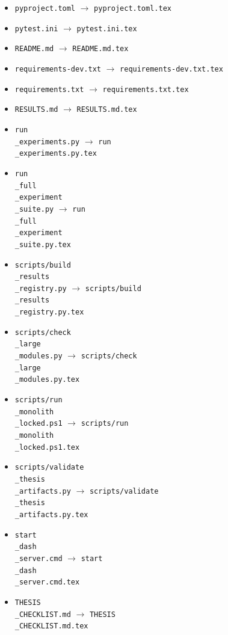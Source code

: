 \documentclass[11pt]{article}
\begin{document}
\begin{itemize}
\item \texttt{pyproject.toml} $\rightarrow$ \texttt{pyproject.toml.tex}
\item \texttt{pytest.ini} $\rightarrow$ \texttt{pytest.ini.tex}
\item \texttt{README.md} $\rightarrow$ \texttt{README.md.tex}
\item \texttt{requirements-dev.txt} $\rightarrow$ \texttt{requirements-dev.txt.tex}
\item \texttt{requirements.txt} $\rightarrow$ \texttt{requirements.txt.tex}
\item \texttt{RESULTS.md} $\rightarrow$ \texttt{RESULTS.md.tex}
\item \texttt{run\\_experiments.py} $\rightarrow$ \texttt{run\\_experiments.py.tex}
\item \texttt{run\\_full\\_experiment\\_suite.py} $\rightarrow$ \texttt{run\\_full\\_experiment\\_suite.py.tex}
\item \texttt{scripts/build\\_results\\_registry.py} $\rightarrow$ \texttt{scripts/build\\_results\\_registry.py.tex}
\item \texttt{scripts/check\\_large\\_modules.py} $\rightarrow$ \texttt{scripts/check\\_large\\_modules.py.tex}
\item \texttt{scripts/run\\_monolith\\_locked.ps1} $\rightarrow$ \texttt{scripts/run\\_monolith\\_locked.ps1.tex}
\item \texttt{scripts/validate\\_thesis\\_artifacts.py} $\rightarrow$ \texttt{scripts/validate\\_thesis\\_artifacts.py.tex}
\item \texttt{start\\_dash\\_server.cmd} $\rightarrow$ \texttt{start\\_dash\\_server.cmd.tex}
\item \texttt{THESIS\\_CHECKLIST.md} $\rightarrow$ \texttt{THESIS\\_CHECKLIST.md.tex}
\end{itemize}
\end{document}
